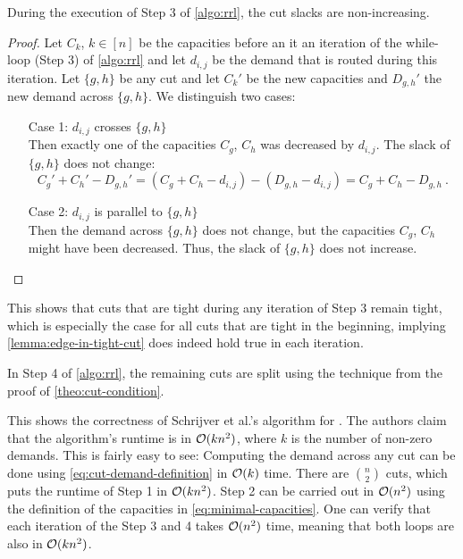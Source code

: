 \begin{lemma}
	\label{lemma:tight-cuts-remain-tight}
	During the execution of Step 3 of \cref{algo:rrl}, the cut slacks are non-increasing.
\end{lemma}
\begin{proof}
	Let $C_k$, $k \in [n]$ be the capacities before an it an iteration of the while-loop (Step 3) of \cref{algo:rrl} and let $d_{i, j}$ be the demand that is routed during this iteration.
	Let $\{g, h\}$ be any cut and let $C_k'$ be the new capacities and $D_{g, h}'$ the new demand across $\{g, h\}$.
	We distinguish two cases:
	\begin{enumerate}[align=left]
		\item[Case 1: $d_{i, j}$ crosses $\{g, h\}$]{\mbox{}\\
			Then exactly one of the capacities $C_g$, $C_h$ was decreased by $d_{i, j}$.
			The slack of $\{g, h\}$ does not change:
			\begin{equation}
				C_g' + C_h' - D_{g, h}' = (C_g + C_h - d_{i, j}) - (D_{g, h} - d_{i, j}) = C_g + C_h - D_{g, h} \ .
			\end{equation}
		}
		\item[Case 2: $d_{i, j}$ is parallel to $\{g, h\}$]{\mbox{}\\
			Then the demand across $\{g, h\}$ does not change, but the capacities $C_g$, $C_h$ might have been decreased.
			Thus, the slack of $\{g, h\}$ does not increase. \qedhere
		}
	\end{enumerate}
\end{proof}

This shows that cuts that are tight during any iteration of Step 3 remain tight, which is especially the case for all cuts that are tight in the beginning, implying \cref{lemma:edge-in-tight-cut} does indeed hold true in each iteration.

In Step 4 of \cref{algo:rrl}, the remaining cuts are split using the technique from the proof of \cref{theo:cut-condition}.

This shows the correctness of Schrijver et al.'s \cite{schrijver99} algorithm for \RRL.
The authors claim that the algorithm's runtime is in $\mathcal{O}(k n^2)$, where $k$ is the number of non-zero demands.
This is fairly easy to see:
Computing the demand across any cut can be done using \cref{eq:cut-demand-definition} in $\mathcal{O}(k)$ time.
There are $\binom{n}{2}$ cuts, which puts the runtime of Step 1 in $\mathcal{O}(k n^2)$.
Step 2 can be carried out in $\mathcal{O}(n^2)$ using the definition of the capacities in \cref{eq:minimal-capacities}.
One can verify that each iteration of the Step 3 and 4 takes $\mathcal{O}(n^2)$ time, meaning that both loops are also in $\mathcal{O}(k n^2)$.

